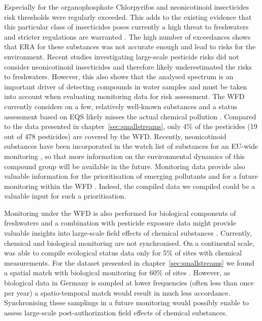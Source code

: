 Especially for the organophosphate Chlorpyrifos and neonicotinoid insecticides risk thresholds were regularly exceeded.
This adds to the existing evidence that this particular class of insecticides poses currently a high threat to freshwaters and stricter regulations are warranted \citep{morrissey_neonicotinoid_2015, goulson_overview_2013}. 
The high number of exceedances shows that ERA for these substances was not accurate enough and lead to risks for the environment. 
Recent studies investigating large-scale pesticide risks did not consider neonicotinoid insecticides \citep{malaj_organic_2014, stehle_pesticide_2015} and therefore likely underestimated the risks to freshwaters. 
However, this also shows that the analysed spectrum is an important driver of detecting compounds in water samples \citep{schreiner_pesticide_2016, malaj_organic_2014} and must be taken into account when evaluating monitoring data for risk assessment. 
The WFD currently considers on a few, relatively well-known substances \citep{european_union_directive_2013} and a status assessment based on EQS likely misses the actual chemical pollution \citep{moschet_how_2014}. 
Compared to the data presented in chapter~\ref{sec:smallstreams}, only 4\% of the pesticides (19 out of 478 pesticides) are covered by the WFD.
Recently, neonicotinoid substances have been incorporated in the watch list of substances for an EU-wide monitoring \citep{european_union_commission_2015}, so that more information on the environmental dynamics of this compound group will be available in the future. 
Monitoring data provide also valuable information for the prioritisation of emerging pollutants and for a future monitoring within the WFD \citep{brack_towards_2017}.
Indeed, the compiled data we compiled could be a valuable input for such a prioritisation. 

Monitoring under the WFD is also performed for biological components of freshwaters and a combination with pesticide exposure data might provide valuable insights into large-scale field effects of chemical substances \citep{schipper_deriving_2014}.
Currently, chemical and biological monitoring are not synchronised.
On a continental scale, \citet{malaj_organic_2014} was able to compile ecological status data only for 5\% of sites with chemical measurements.
For the dataset presented in chapter~\ref{sec:smallstreams} we found a spatial match with biological monitoring for 60\% of sites \citep{brinke_umsetzung_2016}.
However, as biological data in Germany is sampled at lower frequencies (often less than once per year) a spatio-temporal match would result in much less accordance. 
Synchronising these samplings in a future monitoring would possibly enable to assess large-scale post-authorization field effects of chemical substances. 



